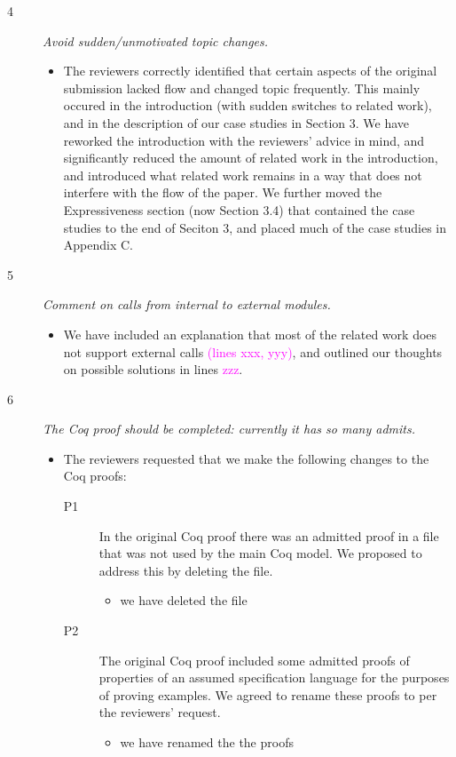 \documentclass[11pt]{amsart}
\newcommand{\ponders}[3]{\marginpar{\tiny\itshape\raggedright\textcolor{#2}{\textbf{#1:} #3}}\ignorespaces}
\newcommand{\jm}[2][]{\ponders{Julian}{magenta}{#1} \textcolor{magenta}{#2}\xspace}
\begin{document}
\begin{description}
\begin{itemize}
 \end{itemize}
 
 \item[4]
 \emph{
 Avoid sudden/unmotivated topic changes.
 }
 \begin{itemize}
 \item
 The reviewers correctly identified that certain
  	aspects of the original submission lacked flow and changed 
  	topic frequently. This mainly occured in the introduction 
  	(with sudden switches to related work), and in the description
  	of our case studies in Section 3. We have reworked the introduction
  	with the reviewers' advice in mind, and significantly reduced the 
  	amount of related work in the introduction, and introduced what 
  	related work remains in a way that does not interfere with the flow 
  	of the paper. We further moved the Expressiveness section (now Section 3.4) that 
  	contained the case studies to the end of Seciton 3, and placed 
  	much of the case studies in Appendix C.
 \end{itemize}
 
 \item[5]
 \emph{
 Comment on calls from internal to external modules.
 }
 \begin{itemize}
 \item
 We have included an explanation that most of the related work does not support external calls \jm[TODO!!]{(lines xxx, yyy)}, and outlined our thoughts on possible solutions in lines \jm[TODO!!]{zzz}.
 \end{itemize}
 
 \item[6]
 \emph{
 The Coq proof should be completed: currently it has so many admits.
 }
 \begin{itemize}
 \item
The reviewers requested that we make the following changes to the Coq proofs:

\begin{description}
\item[P1] 
In the original Coq proof there was an admitted proof in a file that was 
not used by the main Coq model.
We proposed to address this by deleting the file.
\begin{itemize}
\item we have deleted the file
\end{itemize}

\item[P2]  The original Coq proof included some admitted 
proofs of properties of an assumed specification language for
the purposes of proving examples. We agreed to rename these 
proofs to  per the reviewers' request.
\begin{itemize}
\item we have renamed the the proofs
\end{itemize}


\end{description}
\end{itemize}
\end{description}
\end{document}
